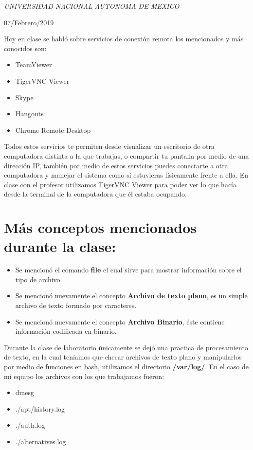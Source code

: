 \documentclass[a4paper, 11pt, oneside]{article}
\begin{document}
\begin{titlepage}
	\textit{UNIVERSIDAD NACIONAL AUTONOMA DE MEXICO} 
	
	\vfill
	
	
	
	
	\vspace{0.3\baselineskip} 
	
	07/Febrero/2019 
	
	 

\end{titlepage}

Hoy en clase se habló sobre servicios de conexión remota los mencionados y más conocidos son:
\begin{itemize}
 \item TeamViewer
 \item TigerVNC Viewer
 \item Skype
 \item Hangouts
 \item Chrome Remote Desktop
\end{itemize}

Todos estos servicios te permiten desde visualizar un escritorio de otra computadora distinta a la que trabajas, o compartir tu pantalla por medio de una dirección IP, también por medio de estos servicios puedes conectarte a otra computadora y manejar el sistema como si estuvieras físicamente frente a ella. En clase con el profesor utilizamos TigerVNC Viewer para poder ver lo que hacía desde la terminal de la computadora que él estaba ocupando.

\section*{Más conceptos mencionados durante la clase:}
\begin{itemize}
 \item Se mencionó el comando \textbf{file} el cual sirve para mostrar información sobre el tipo de archivo.
 \item Se mencionó nuevamente el concepto \textbf{Archivo de texto plano}, es un simple archivo de texto formado por caracteres.
 \item Se mencionó nuevamente el concepto \textbf{Archivo Binario}, éste contiene información codificada en binario.
\end{itemize}

Durante la clase de laboratorio únicamente se dejó una practica de procesamiento de texto, en la cual teníamos que checar archivos de texto plano y manipularlos por medio de funciones en bash, utilizamos el directorio \textbf{/var/log/}. En el caso de mi equipo los archivos con los que trabajamos fueron:

\begin{itemize}
 \item dmesg
 \item ./apt/history.log
 \item ./auth.log
 \item ./alternatives.log
\end{itemize}
\end{document}

